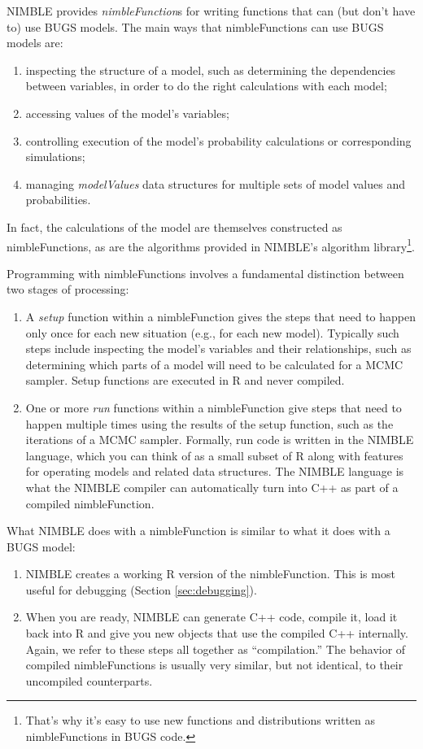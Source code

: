 \documentclass[12pt,oneside]{book}\usepackage[]{graphicx}\usepackage[]{color}
\def\nm#1{\textit{#1}}
\begin{document}
NIMBLE provides \nm{nimbleFunction}s for writing functions that can
(but don't have to) use BUGS models.  The main ways that nimbleFunctions can use
BUGS models are:

\begin{enumerate}
\item inspecting the structure of a model, such as determining the
  dependencies between variables, in order to do the right
  calculations with each model;
\item accessing values of the model's variables;
\item controlling execution of the model's probability calculations
  or corresponding simulations;
\item managing \nm{modelValues} data structures for multiple sets of
  model values and probabilities.
\end{enumerate}

In fact, the calculations of the model are themselves constructed as
nimbleFunctions, as are the algorithms provided in
NIMBLE's algorithm library\footnote{That's why it's easy to use new
  functions and distributions written as nimbleFunctions in BUGS code.}.

Programming with nimbleFunctions involves a fundamental distinction
between two stages of processing:
\begin{enumerate}

\item A \nm{setup} function within a nimbleFunction gives the steps
  that need to happen only once for each new situation (e.g., for each
  new model).  Typically such steps include inspecting the model's
  variables and their relationships, such as determining which parts
  of a model will need to be calculated for a MCMC sampler. Setup
  functions are executed in R and never compiled.

\item One or more \nm{run} functions within a nimbleFunction give
  steps that need to happen multiple times using the results of the
  setup function, such as the iterations of a MCMC sampler.
  Formally, run code is written in the NIMBLE language, which you
  can think of as a small subset of R along with features for
  operating models and related data structures.  The NIMBLE language
  is what the NIMBLE compiler can automatically turn into C++ as part
  of a compiled nimbleFunction.
\end{enumerate}

What NIMBLE does with a nimbleFunction is similar to what it does
with a BUGS model:
\begin{enumerate}
\item NIMBLE creates a working R version of the nimbleFunction.
  This is most useful for debugging (Section \ref{sec:debugging}).
\item When you are ready, NIMBLE can generate C++ code, compile it,
  load it back into R and give you new objects that use the compiled
  C++ internally.  Again, we refer to these steps all together as ``compilation.''  The behavior of compiled nimbleFunctions is
  usually very similar, but not identical, to their uncompiled
  counterparts.
\end{enumerate}
\end{document}
